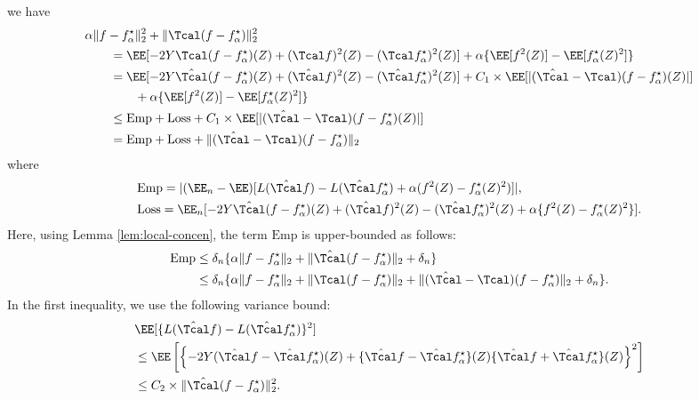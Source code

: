 \documentclass[14pt]{extarticle} %
\begin{document}
we have 
\begin{align}\label{eq:single-quadratic}
    & \alpha \|f - f^{\star}_{\alpha} \|^2_2 + \|\Tcal(f-f^{\star}_{\alpha})\|^2_2  \nonumber\\ 
    &\qquad= \EE[ - 2 Y  \Tcal (f-f^{\star}_{\alpha})(Z)  + (\Tcal f)^2(Z) -  (\Tcal f^{\star}_{\alpha})^2(Z) ] +  \alpha\{\EE[f^2(Z)] - \EE[f^{\star}_{\alpha}(Z)^2]\}\nonumber\\
    &\qquad= \EE[ - 2 Y  \hat \Tcal (f-f^{\star}_{\alpha})(Z) + (\hat \Tcal f)^2(Z) - (\hat \Tcal f^{\star}_{\alpha})^2(Z) ]   +  C_1 \times \EE[|(\hat \Tcal - \Tcal) (f-f^{\star}_{\alpha})(Z)|] \nonumber\\ 
    &\qquad\qquad+  \alpha\{\EE[f^2(Z)] - \EE[f^{\star}_{\alpha}(Z)^2]\} \nonumber\\
    &\qquad\leq \mathrm{Emp} + \mathrm{Loss} + C_1 \times \EE[|(\hat \Tcal - \Tcal) (f-f^{\star}_{\alpha})(Z)|]  \nonumber\\ 
    &\qquad= \mathrm{Emp} + \mathrm{Loss} + \|(\hat \Tcal-\Tcal) (  f - f^{\star}_{\alpha})\|_2
\end{align}
where 
\begin{align*}
    &\mathrm{Emp} = |(\EE_n-\EE)  [L(\hat \Tcal f)- L(\hat \Tcal f^{\star}_{\alpha})+\alpha(f^2(Z)-f^{\star}_{\alpha}(Z)^2)]|,  \\ 
    & \mathrm{Loss} =  \EE_n[ -2Y  \hat \Tcal (f-f^{\star}_{\alpha})(Z)  + (\hat \Tcal f)^2(Z) - (\hat \Tcal f^{\star}_{\alpha})^2(Z) + \alpha\{f^2(Z)- f^{\star}_{\alpha}(Z)^2 \}]. 
\end{align*} 
Here, using Lemma \ref{lem:local-concen}, the term $\mathrm{Emp} $ is upper-bounded as follows: 
\begin{align}\label{eq:single-emp}    
  \mathrm{Emp}  &\leq \delta_n\{ \alpha \|f-f^{\star}_{\alpha}\|_2+ \|\hat \Tcal(f-f^{\star}_{\alpha})\|_2+   \delta_n   \} \nonumber\\ 
&\leq \delta_n\{ \alpha \|f-f^{\star}_{\alpha}\|_2 +  \|\Tcal(f-f^{\star}_{\alpha})\|_2 + \|(\hat \Tcal-\Tcal)(f-f^{\star}_{\alpha})\|_2+   \delta_n   \}. 
\end{align} 
In the first inequality, we use the following variance bound: 
\begin{align*}
    &\EE[\{L(\hat \Tcal f)- L(\hat \Tcal f^{\star}_{\alpha})\}^2]\\
    &\leq \EE\left [ \left \{ -2 Y ( \hat \Tcal f - \hat \Tcal f^{\star}_{\alpha})(Z) + \{\hat \Tcal f-\hat \Tcal f^{\star}_{\alpha} \}(Z)\{ \hat \Tcal f + \hat \Tcal f^{\star}_{\alpha}\}(Z) \right \}^2 \right ] \\ 
    &\leq C_2 \times \|\hat \Tcal (  f - f^{\star}_{\alpha})\|^2_2. 
\end{align*}
\end{document}
